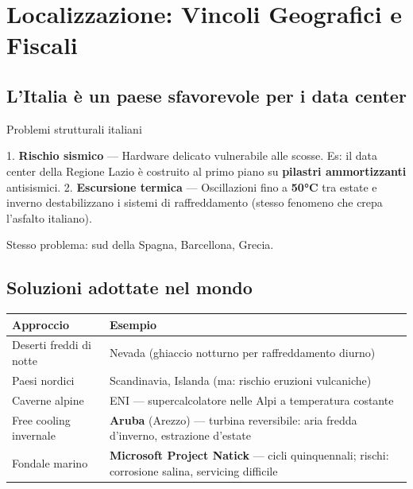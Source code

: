 \documentclass[
  italian,
  openany]{book}
\newcounter{none} %
\begin{document}
\section{Localizzazione: Vincoli Geografici e
Fiscali}\label{localizzazione-vincoli-geografici-e-fiscali}

\subsection{L'Italia è un paese sfavorevole per i data
center}\label{litalia-uxe8-un-paese-sfavorevole-per-i-data-center}

\begin{calloutimportant}{Problemi strutturali italiani}

1. \textbf{Rischio sismico} --- Hardware delicato vulnerabile alle
scosse. Es: il data center della Regione Lazio è costruito al primo
piano su \textbf{pilastri ammortizzanti} antisismici. 2.
\textbf{Escursione termica} --- Oscillazioni fino a \textbf{50°C} tra
estate e inverno destabilizzano i sistemi di raffreddamento (stesso
fenomeno che crepa l'asfalto italiano).

\end{calloutimportant}

Stesso problema: sud della Spagna, Barcellona, Grecia.

\subsection{Soluzioni adottate nel
mondo}\label{soluzioni-adottate-nel-mondo}

{\def\LTcaptype{none} %
\begin{longtable}[]{@{}
  >{\raggedright\arraybackslash}p{}
  >{\raggedright\arraybackslash}p{}@{}}
\toprule\noalign{}
\begin{minipage}[b]{\linewidth}\raggedright
Approccio
\end{minipage} & \begin{minipage}[b]{\linewidth}\raggedright
Esempio
\end{minipage} \\
\midrule\noalign{}
\endhead
\bottomrule\noalign{}
\endlastfoot
Deserti freddi di notte & Nevada (ghiaccio notturno per raffreddamento
diurno) \\
Paesi nordici & Scandinavia, Islanda (ma: rischio eruzioni
vulcaniche) \\
Caverne alpine & ENI --- supercalcolatore nelle Alpi a temperatura
costante \\
Free cooling invernale & \textbf{Aruba} (Arezzo) --- turbina
reversibile: aria fredda d'inverno, estrazione d'estate \\
Fondale marino & \textbf{Microsoft Project Natick} --- cicli
quinquennali; rischi: corrosione salina, servicing difficile \\
\end{longtable}
}
\end{document}
